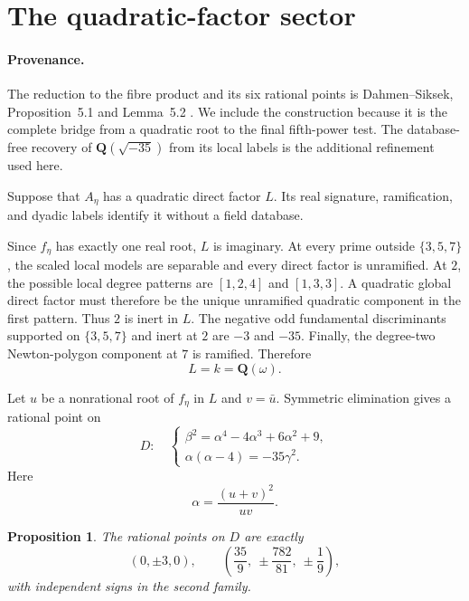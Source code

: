 \documentclass[11pt]{article}
\newcommand{\Q}{\mathbf Q}
\newtheorem{proposition}[theorem]{Proposition}
\theoremstyle{definition}
\theoremstyle{remark}
\begin{document}
\section{The quadratic-factor sector}

\paragraph{Provenance.}
The reduction to the fibre product and its six rational points is
Dahmen--Siksek, Proposition~5.1 and Lemma~5.2
\cite[Section~5]{DahmenSiksek}.  We include the construction because it is
the complete bridge from a quadratic root to the final fifth-power test.  The
database-free recovery of $\Q(\sqrt{-35})$ from its local labels is the
additional refinement used here.

Suppose that $A_\eta$ has a quadratic direct factor $L$.  Its real
signature, ramification, and dyadic labels identify it without a field
database.

Since $f_\eta$ has exactly one real root, $L$ is imaginary.  At every prime
outside $\{3,5,7\}$, the scaled local models are separable and every direct
factor is unramified.  At $2$, the possible local degree patterns are
$[1,2,4]$ and $[1,3,3]$.  A quadratic global direct factor must therefore
be the unique unramified quadratic component in the first pattern.  Thus
$2$ is inert in $L$.  The negative odd fundamental discriminants supported
on $\{3,5,7\}$ and inert at $2$ are $-3$ and $-35$.  Finally, the
degree-two Newton-polygon component at $7$ is ramified.  Therefore
\begin{equation}\label{eq:quadratic-field}
                              L=k=\Q(\omega).
\end{equation}

Let $u$ be a nonrational root of $f_\eta$ in $L$ and $v=\bar u$.  Symmetric
elimination gives a rational point on
\begin{equation}\label{eq:fibre-product}
 D:\quad
 \begin{cases}
 \beta^2=\alpha^4-4\alpha^3+6\alpha^2+9,\\
 \alpha(\alpha-4)=-35\gamma^2.
 \end{cases}
\end{equation}
Here
\[
                    \alpha=\frac{(u+v)^2}{uv}.
\]

\begin{proposition}\label{prop:six-points}
The rational points on $D$ are exactly
\[
 (0,\pm3,0),\qquad
 \left(\frac{35}{9},\ \pm\frac{782}{81},\ \pm\frac19\right),
\]
with independent signs in the second family.
\end{proposition}
\end{document}
